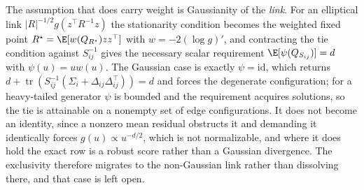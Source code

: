 The assumption that does carry weight is Gaussianity of the \emph{link}. For an elliptical link \(\lvert R\rvert^{-1/2}g(z^\top R^{-1}z)\) the stationarity condition becomes the weighted fixed point \(R^\star=\E[w(Q_{R^\star})zz^\top]\) with \(w=-2(\log g)'\), and contracting the tie condition against \(S_{ij}^{-1}\) gives the necessary scalar requirement \(\E[\psi(Q_{S_{ij}})]=d\) with \(\psi(u)=uw(u)\). The Gaussian case is exactly \(\psi=\mathrm{id}\), which returns \(d+\operatorname{tr}(S_{ij}^{-1}(\Sigma_i+\Delta_{ij}\Delta_{ij}^\top))=d\) and forces the degenerate configuration; for a heavy-tailed generator \(\psi\) is bounded and the requirement acquires solutions, so the tie is attainable on a nonempty set of edge configurations. It does not become an identity, since a nonzero mean residual obstructs it and demanding it identically forces \(g(u)\propto u^{-d/2}\), which is not normalizable, and where it does hold the exact row is a robust score rather than a Gaussian divergence. The exclusivity therefore migrates to the non-Gaussian link rather than dissolving there, and that case is left open.
